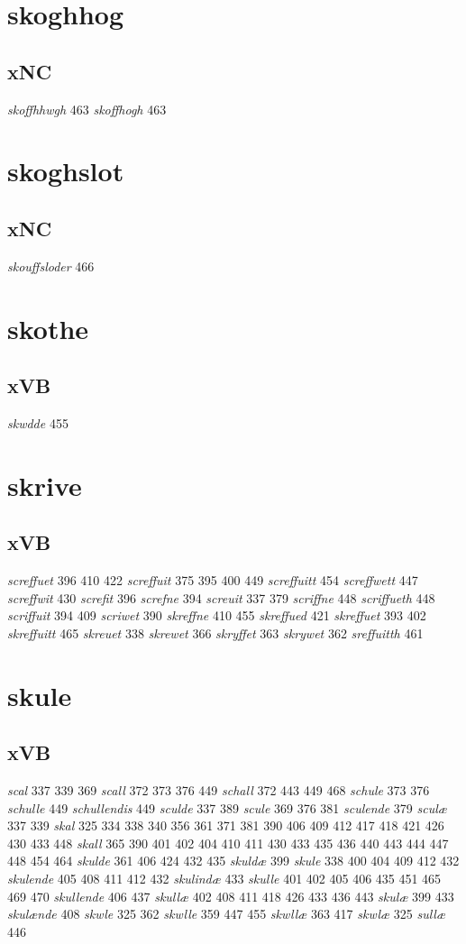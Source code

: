 \documentclass[a4paper,twocolumn]{article}
\begin{document}
\section{skoghhog}
\label{sec:org403ef6a}
\subsection{xNC}
\label{sec:org6934c3d}
\emph{skoffhhwgh} 463 \emph{skoffhogh} 463 
\section{skoghslot}
\label{sec:org2316f32}
\subsection{xNC}
\label{sec:org1a0b194}
\emph{skouffsloder} 466 
\section{skothe}
\label{sec:org7e74dfd}
\subsection{xVB}
\label{sec:org008eaf6}
\emph{skwdde} 455 
\section{skrive}
\label{sec:orgd616ab7}
\subsection{xVB}
\label{sec:orga202f35}
\emph{screffuet} 396 410 422 \emph{screffuit} 375 395 400 449 \emph{screffuitt} 454 \emph{screffwett} 447 \emph{screffwit} 430 \emph{screfit} 396 \emph{screfne} 394 \emph{screuit} 337 379 \emph{scriffne} 448 \emph{scriffueth} 448 \emph{scriffuit} 394 409 \emph{scriwet} 390 \emph{skreffne} 410 455 \emph{skreffued} 421 \emph{skreffuet} 393 402 \emph{skreffuitt} 465 \emph{skreuet} 338 \emph{skrewet} 366 \emph{skryffet} 363 \emph{skrywet} 362 \emph{sreffuitth} 461 
\section{skule}
\label{sec:org2bf3399}
\subsection{xVB}
\label{sec:orga6ca8e0}
\emph{scal} 337 339 369 \emph{scall} 372 373 376 449 \emph{schall} 372 443 449 468 \emph{schule} 373 376 \emph{schulle} 449 \emph{schullendis} 449 \emph{sculde} 337 389 \emph{scule} 369 376 381 \emph{sculende} 379 \emph{sculæ} 337 339 \emph{skal} 325 334 338 340 356 361 371 381 390 406 409 412 417 418 421 426 430 433 448 \emph{skall} 365 390 401 402 404 410 411 430 433 435 436 440 443 444 447 448 454 464 \emph{skulde} 361 406 424 432 435 \emph{skuldæ} 399 \emph{skule} 338 400 404 409 412 432 \emph{skulende} 405 408 411 412 432 \emph{skulindæ} 433 \emph{skulle} 401 402 405 406 435 451 465 469 470 \emph{skullende} 406 437 \emph{skullæ} 402 408 411 418 426 433 436 443 \emph{skulæ} 399 433 \emph{skulænde} 408 \emph{skwle} 325 362 \emph{skwlle} 359 447 455 \emph{skwllæ} 363 417 \emph{skwlæ} 325 \emph{sullæ} 446 
\end{document}
